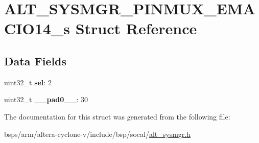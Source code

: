 \hypertarget{structALT__SYSMGR__PINMUX__EMACIO14__s}{}\section{A\+L\+T\+\_\+\+S\+Y\+S\+M\+G\+R\+\_\+\+P\+I\+N\+M\+U\+X\+\_\+\+E\+M\+A\+C\+I\+O14\+\_\+s Struct Reference}
\label{structALT__SYSMGR__PINMUX__EMACIO14__s}
\subsection*{Data Fields}
\begin{DoxyCompactItemize}
\item 
\mbox{\label{structALT__SYSMGR__PINMUX__EMACIO14__s_a3c994ac311782050609ec65041db4bc7}} 
uint32\+\_\+t {\bfseries sel}\+: 2
\item 
\mbox{\label{structALT__SYSMGR__PINMUX__EMACIO14__s_a397ed7814b55e756d2480b0f90c21af4}} 
uint32\+\_\+t {\bfseries \+\_\+\+\_\+pad0\+\_\+\+\_\+}\+: 30
\end{DoxyCompactItemize}


The documentation for this struct was generated from the following file\+:\begin{DoxyCompactItemize}
\item 
bsps/arm/altera-\/cyclone-\/v/include/bsp/socal/\mbox{\hyperlink{alt__sysmgr_8h}{alt\+\_\+sysmgr.\+h}}\end{DoxyCompactItemize}
